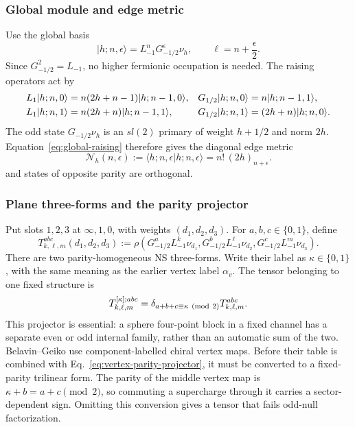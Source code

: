 \documentclass[11pt]{article}
\begin{document}
\subsubsection{Global module and edge metric}

Use the global basis
\begin{equation}
 |h;n,\epsilon\rangle
 =L_{-1}^{n}G_{-1/2}^{\epsilon}\nu_h,
 \qquad
 \ell=n+\frac\epsilon2.
 \label{eq:global-basis}
\end{equation}
Since \(G_{-1/2}^2=L_{-1}\), no higher fermionic occupation is needed.  The
raising operators act by
\begin{align}
 L_1|h;n,0\rangle
 &=n(2h+n-1)|h;n-1,0\rangle,
 &
 G_{1/2}|h;n,0\rangle
 &=n|h;n-1,1\rangle,
 \notag\\
 L_1|h;n,1\rangle
 &=n(2h+n)|h;n-1,1\rangle,
 &
 G_{1/2}|h;n,1\rangle
 &=(2h+n)|h;n,0\rangle.
 \label{eq:global-raising}
\end{align}
The odd state \(G_{-1/2}\nu_h\) is an \(sl(2)\) primary of weight
\(h+1/2\) and norm \(2h\).  Equation~\eqref{eq:global-raising} therefore
gives the diagonal edge metric
\begin{equation}
 \mathcal N_h(n,\epsilon)
 :=\langle h;n,\epsilon|h;n,\epsilon\rangle
 =n!\,(2h)_{n+\epsilon}.
 \label{eq:global-norm}
\end{equation}
and states of opposite parity are orthogonal.

\subsubsection{Plane three-forms and the parity projector}

Put slots \(1,2,3\) at \(\infty,1,0\), with weights
\((d_1,d_2,d_3)\).  For \(a,b,c\in\{0,1\}\), define
\begin{equation}
 T_{k,\ell,m}^{abc}(d_1,d_2,d_3)
 :=\rho\!\left(
 G_{-1/2}^{a}L_{-1}^{k}\nu_{d_1},
 G_{-1/2}^{b}L_{-1}^{\ell}\nu_{d_2},
 G_{-1/2}^{c}L_{-1}^{m}\nu_{d_3}
 \right).
 \label{eq:global-three-chain}
\end{equation}
There are two parity-homogeneous NS three-forms.  Write their label as
\(\kappa\in\{0,1\}\), with the same meaning as the earlier vertex label
\(\alpha_v\).  The tensor belonging to one fixed structure is
\begin{equation}
 T_{k,\ell,m}^{[\kappa];abc}
 =\delta_{a+b+c\equiv\kappa\ ({\rm mod}\ 2)}
  T_{k,\ell,m}^{abc}.
 \label{eq:vertex-parity-projector}
\end{equation}
This projector is essential: a sphere four-point block in a fixed channel
has a separate even or odd internal family, rather than an automatic sum of
the two.  Belavin--Geiko use component-labelled chiral vertex maps.  Before
their table is combined with Eq.~\eqref{eq:vertex-parity-projector}, it must
be converted to a fixed-parity trilinear form.  The parity of the middle
vertex map is \(\kappa+b=a+c\pmod2\), so commuting a supercharge through it
carries a sector-dependent sign.  Omitting this conversion gives a tensor
that fails odd-null factorization.
\end{document}
